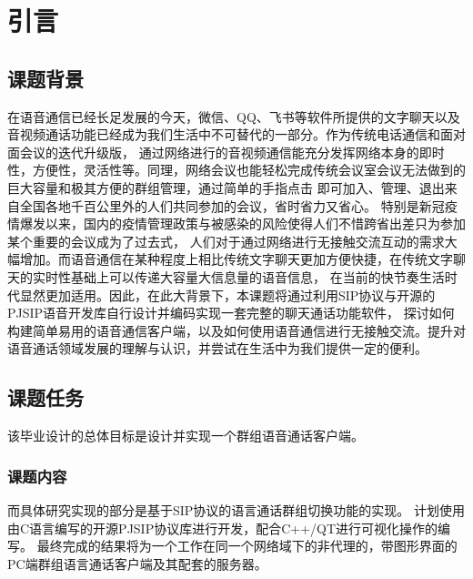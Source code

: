 \documentclass[a4paper,AutoFakeBold,oneside,12pt]{book}
\begin{document}
%  

%  

%  

% 

\frontmatter\tableofcontents %


\newpage\mainmatter
{}


\chapter{引言}
\section{课题背景}
在语音通信已经长足发展的今天，微信、QQ、飞书等软件所提供的文字聊天以及音视频通话功能已经成为我们生活中不可替代的一部分。作为传统电话通信和面对面会议的迭代升级版，
通过网络进行的音视频通信能充分发挥网络本身的即时性，方便性，灵活性等。同理，网络会议也能轻松完成传统会议室会议无法做到的巨大容量和极其方便的群组管理，通过简单的手指点击
即可加入、管理、退出来自全国各地千百公里外的人们共同参加的会议，省时省力又省心。
特别是新冠疫情爆发以来，国内的疫情管理政策与被感染的风险使得人们不惜跨省出差只为参加某个重要的会议成为了过去式，
人们对于通过网络进行无接触交流互动的需求大幅增加。而语音通信在某种程度上相比传统文字聊天更加方便快捷，在传统文字聊天的实时性基础上可以传递大容量大信息量的语音信息，
在当前的快节奏生活时代显然更加适用。因此，在此大背景下，本课题将通过利用SIP协议与开源的PJSIP语音开发库自行设计并编码实现一套完整的聊天通话功能软件，
探讨如何构建简单易用的语音通信客户端，以及如何使用语音通信进行无接触交流。提升对语音通话领域发展的理解与认识，并尝试在生活中为我们提供一定的便利。
\section{课题任务}
该毕业设计的总体目标是设计并实现一个群组语音通话客户端。
\subsection{课题内容}
而具体研究实现的部分是基于SIP协议的语言通话群组切换功能的实现。
计划使用由C语言编写的开源PJSIP协议库进行开发，配合C++/QT进行可视化操作的编写。
最终完成的结果将为一个工作在同一个网络域下的非代理的，带图形界面的PC端群组语言通话客户端及其配套的服务器。
\end{document}
